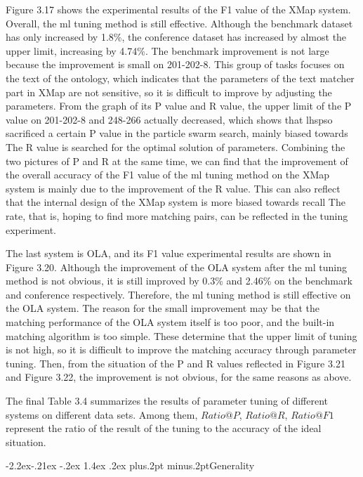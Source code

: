\documentclass[twoside]{article}
\makeatletter
\def\subsubsection{\@startsection{subsubsection}{3}{\z@}%
 {-2.2ex\@plus -.21ex \@minus -.2ex}%
 {1.4ex \@plus.2ex}
{\normalfont\normalsize\protect\baselineskip=12pt plus.2pt minus.2pt\sl}}
\makeatother
\begin{document}
\begin{multicols}{2}
Figure 3.17 shows the experimental results of the F1 value of the XMap system. 
Overall, the ml tuning method is still effective. Although the benchmark dataset has only increased by 1.8\%, the conference dataset has increased by almost the upper limit, increasing by 4.74\%. 
The benchmark improvement is not large because the improvement is small on 201-202-8. This group of tasks focuses on the text of the ontology, which indicates that the parameters of the text matcher part in XMap are not sensitive, so it is difficult to improve by adjusting the parameters. 
From the graph of its P value and R value, the upper limit of the P value on 201-202-8 and 248-266 actually decreased, which shows that lhspso sacrificed a certain P value in the particle swarm search, mainly biased towards The R value is searched for the optimal solution of parameters. 
Combining the two pictures of P and R at the same time, we can find that the improvement of the overall accuracy of the F1 value of the ml tuning method on the XMap system is mainly due to the improvement of the R value. This can also reflect that the internal design of the XMap system is more biased towards recall The rate, that is, hoping to find more matching pairs, can be reflected in the tuning experiment.

The last system is OLA, and its F1 value experimental results are shown in Figure 3.20. 
Although the improvement of the OLA system after the ml tuning method is not obvious, it is still improved by 0.3\% and 2.46\% on the benchmark and conference respectively. Therefore, the ml tuning method is still effective on the OLA system. 
The reason for the small improvement may be that the matching performance of the OLA system itself is too poor, and the built-in matching algorithm is too simple. These determine that the upper limit of tuning is not high, so it is difficult to improve the matching accuracy through parameter tuning. 
Then, from the situation of the P and R values reflected in Figure 3.21 and Figure 3.22, the improvement is not obvious, for the same reasons as above.

The final Table 3.4 summarizes the results of parameter tuning of different systems on different data sets. Among them, $Ratio@P$, $Ratio@R$, $Ratio@F1$ represent the ratio of the result of the tuning to the accuracy of the ideal situation.

\subsubsection{Generality}


\end{multicols}
\end{document}
